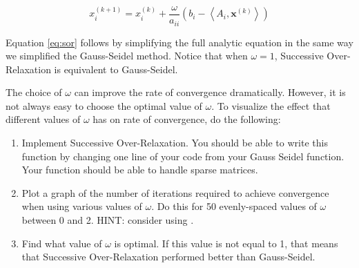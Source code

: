 \begin{equation} \label{eq:sor}
x^{(k+1)}_i = x^{(k)}_i + \frac{\omega}{a_{ii}} \left ( b_i - \left < A_i, \mathbf{x}^{(k)} \right > \right )
\end{equation}

Equation \ref{eq:sor} follows by simplifying the full analytic equation in the
same way we simplified the Gauss-Seidel method. Notice that when $\omega = 1$,
Successive Over-Relaxation is equivalent to Gauss-Seidel.

\begin{problem}[Optional]
The choice of $\omega$ can improve the rate of convergence dramatically. However,
it is not always easy to choose the optimal value of $\omega$. To visualize the
effect that different values of $\omega$ has on rate of convergence, do the
following:
\begin{enumerate}
    \item Implement Successive Over-Relaxation. You should be able to write
    this function by changing one line of your code from your Gauss Seidel
    function. Your function should be able to handle sparse matrices.
    \item Plot a graph of the number of iterations required to achieve
    convergence when using various values of $\omega$. Do this for 50
    evenly-spaced values of $\omega$ between 0 and 2. HINT: consider using .
    \item Find what value of $\omega$ is optimal. If this value is not equal to
    1, that means that Successive Over-Relaxation performed better than
    Gauss-Seidel.
\end{enumerate}
\end{problem}

